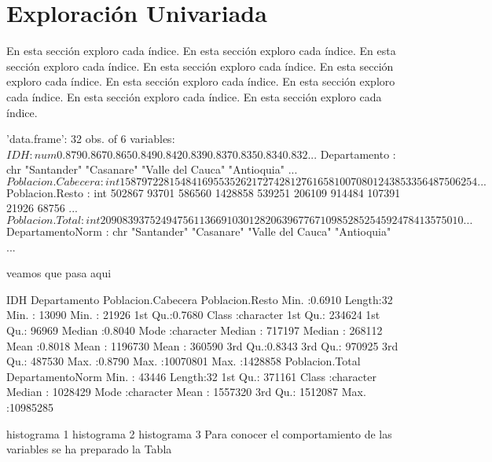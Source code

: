 \section{Exploración Univariada}\label{univariada}

En esta sección exploro cada índice. En esta sección exploro cada índice. En esta sección exploro cada índice. En esta sección exploro cada índice. En esta sección exploro cada índice. En esta sección exploro cada índice. En esta sección exploro cada índice. En esta sección exploro cada índice. En esta sección exploro cada índice.



\begin{Schunk}
\begin{Soutput}
'data.frame':	32 obs. of  6 variables:
 $ IDH               : num  0.879 0.867 0.865 0.849 0.842 0.839 0.837 0.835 0.834 0.832 ...
 $ Departamento      : chr  "Santander" "Casanare" "Valle del Cauca" "Antioquia" ...
 $ Poblacion.Cabecera: int  1587972 281548 4169553 5262172 742812 761658 10070801 2438533 56487 506254 ...
 $ Poblacion.Resto   : int  502867 93701 586560 1428858 539251 206109 914484 107391 21926 68756 ...
 $ Poblacion.Total   : int  2090839 375249 4756113 6691030 1282063 967767 10985285 2545924 78413 575010 ...
 $ DepartamentoNorm  : chr  "Santander" "Casanare" "Valle del Cauca" "Antioquia" ...
\end{Soutput}
\end{Schunk}

veamos que pasa aqui
\begin{Schunk}
\begin{Soutput}
      IDH         Departamento       Poblacion.Cabecera Poblacion.Resto  
 Min.   :0.6910   Length:32          Min.   :   13090   Min.   :  21926  
 1st Qu.:0.7680   Class :character   1st Qu.:  234624   1st Qu.:  96969  
 Median :0.8040   Mode  :character   Median :  717197   Median : 268112  
 Mean   :0.8018                      Mean   : 1196730   Mean   : 360590  
 3rd Qu.:0.8343                      3rd Qu.:  970925   3rd Qu.: 487530  
 Max.   :0.8790                      Max.   :10070801   Max.   :1428858  
 Poblacion.Total    DepartamentoNorm  
 Min.   :   43446   Length:32         
 1st Qu.:  371161   Class :character  
 Median : 1028429   Mode  :character  
 Mean   : 1557320                     
 3rd Qu.: 1512087                     
 Max.   :10985285                     
\end{Soutput}
\end{Schunk}
histograma 1 
histograma 2
histograma 3
Para conocer el comportamiento de las variables se ha preparado la Tabla %





\endinput
